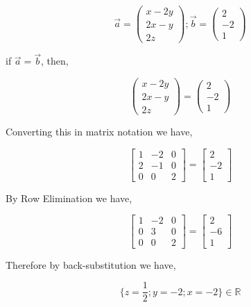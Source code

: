 

$$\overrightarrow{a} = 
\begin{pmatrix}
	x - 2y \\
	2x - y \\
	2z
\end{pmatrix} ; \overrightarrow{b} = 
\begin{pmatrix}
	2 \\
	-2 \\
	1
\end{pmatrix}$$

if $\overrightarrow{a} = \overrightarrow{b}$, then,

$$\begin{pmatrix}
	x - 2y \\
	2x - y \\
	2z
\end{pmatrix} = \begin{pmatrix}
	2 \\
	-2 \\
	1
\end{pmatrix}$$

Converting this in matrix notation we have,

$$\begin{bmatrix}
1 & -2 & 0 \\
2 & -1 & 0 \\
0 & 0 & 2 
\end{bmatrix} = \begin{bmatrix}
2 \\
-2 \\
1
\end{bmatrix}$$

By Row Elimination we have,

$$\begin{bmatrix}
1 & -2 & 0 \\
0 & 3 & 0 \\
0 & 0 & 2 
\end{bmatrix} = \begin{bmatrix}
2 \\
-6 \\
1
\end{bmatrix}$$

Therefore by back-substitution we have,

$$\{z = \frac{1}{2}; y = -2; x = -2\} \in \mathbb{R}$$

